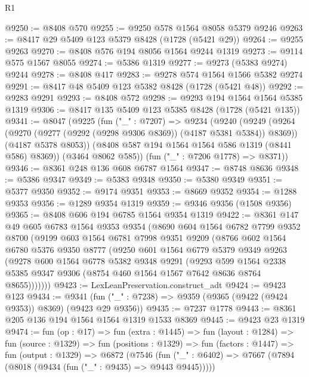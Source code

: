 \begin{lexlean}{R1}
\begin{coremodule}
@9250 := @8408 @570
@9255 := @9250 @578 @1564 @8058 @5379 @9246
@9263 := @8417 @29 @5409 @123 @5379 @8428 (@1728 (@5421 @29))
@9264 := @9255 @9263
@9270 := @8408 @576 @194 @8056 @1564 @9244 @1319
@9273 := @9114 @575 @1567 @8055
@9274 := @5386 @1319
@9277 := @9273 (@5383 @9274) @9244
@9278 := @8408 @417
@9283 := @9278 @574 @1564 @1566 @5382 @9274
@9291 := @8417 @48 @5409 @123 @5382 @8428 (@1728 (@5421 @48))
@9292 := @9283 @9291
@9293 := @8408 @572
@9298 := @9293 @194 @1564 @1564 @5385 @1319
@9306 := @8417 @135 @5409 @123 @5385 @8428 (@1728 (@5421 @135))
@9341 := @8047
    (@9225
      (fun ("_" : @7207) =>
      @9234
        (@9240
          (@9249
            (@9264 (@9270 (@9277 (@9292 (@9298 @9306 @8369)) (@4187 @5381 @5384)) @8369))
            (@4187 @5378 @8053))
          (@8408 @587 @194 @1564 @1564 @586 @1319 (@8441 @586) @8369))
        (@3464 @8062 @585))
      (fun ("_" : @7206 @1778) => @8371))
@9346 := @8361 @248 @136 @608 @6787 @1564
@9347 := @8748 @8636
@9348 := @5386 @9347
@9349 := @5383 @9348
@9350 := @5380 @9349
@9351 := @5377 @9350
@9352 := @9174 @9351
@9353 := @8669 @9352
@9354 := @1288 @9353
@9356 := @1289 @9354 @1319
@9359 := @9346 @9356 (@1508 @9356)
@9365 := @8408 @606 @194 @6785 @1564 @9354 @1319
@9422 := @8361
    @147
    @49
    @605
    @6783
    @1564
    @9353
    @9354
    (@8690
      @604
      @1564
      @6782
      @7799
      @9352
      @8700
      (@9199
        @603
        @1564
        @6781
        @7998
        @9351
        @9209
        (@8766
          @602
          @1564
          @6780
          @5376
          @9350
          @8777
          (@9250
            @601
            @1564
            @6779
            @5379
            @9349
            @9263
            (@9278
              @600
              @1564
              @6778
              @5382
              @9348
              @9291
              (@9293
                @599
                @1564
                @2338
                @5385
                @9347
                @9306
                (@8754 @460 @1564 @1567 @7642 @8636 @8764 @8655)))))))
@9423 := LexLeanPreservation.construct_adt
@9424 := @9423 @123
@9434 := @9341 (fun ("_" : @7238) => @9359 (@9365 (@9422 (@9424 @9353)) @8369) (@9423 @29 @9356))
@9435 := @7237 @1778
@9443 := @8361 @205 @136 @194 @1564 @1564 @1319 @1533 @8369
@9445 := @9423 @23 @1319
@9474 := fun (op : @17) =>
  fun (extra : @1445) =>
  fun (layout : @1284) =>
  fun (source : @1329) =>
  fun (positions : @1329) =>
  fun (factors : @1447) =>
  fun (output : @1329) =>
  @6872
    (@7546
      (fun ("_" : @6402) => @7667 (@7894 (@8018 (@9434 (fun ("_" : @9435) => @9443 @9445)))))

\end{coremodule}
\end{lexlean}
